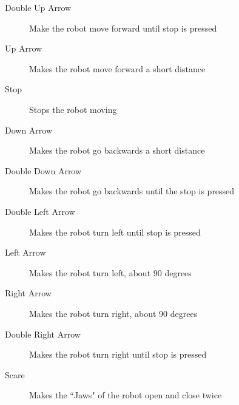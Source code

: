 \documentclass[]{article}   	%
\begin{document}
{{\begin{description}
	\item[Double Up Arrow] Make the robot move forward until stop is pressed
	\item[Up Arrow] Makes the robot move forward a short distance
	\item[Stop] Stops the robot moving
	\item[Down Arrow] Makes the robot go backwards a short distance
	\item[Double Down Arrow] Makes the robot go backwards until the stop is pressed
	\item[Double Left Arrow] Makes the robot turn left until stop is pressed
	\item[Left Arrow] Makes the robot turn left, about 90 degrees
	\item[Right Arrow] Makes the robot turn right, about 90 degrees
	\item[Double Right Arrow] Makes the robot turn right until stop is pressed
	\item[Scare] Makes the ``Jaws" of the robot open and close twice
\end{description}
}

}
\end{document}
